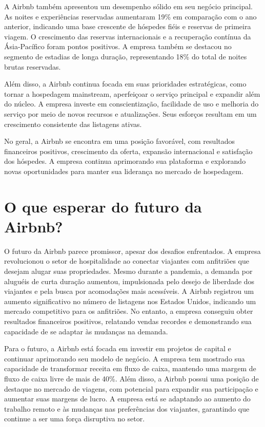 \documentclass{article}
\begin{document}
A Airbnb também apresentou um desempenho sólido em seu negócio principal. As noites e experiências reservadas aumentaram 19\% em comparação com o ano anterior, indicando uma base crescente de hóspedes fiéis e reservas de primeira viagem. O crescimento das reservas internacionais e a recuperação contínua da Ásia-Pacífico foram pontos positivos. A empresa também se destacou no segmento de estadias de longa duração, representando 18\% do total de noites brutas reservadas.

Além disso, a Airbnb continua focada em suas prioridades estratégicas, como tornar a hospedagem mainstream, aperfeiçoar o serviço principal e expandir além do núcleo. A empresa investe em conscientização, facilidade de uso e melhoria do serviço por meio de novos recursos e atualizações. Seus esforços resultam em um crescimento consistente das listagens ativas.

No geral, a Airbnb se encontra em uma posição favorável, com resultados financeiros positivos, crescimento da oferta, expansão internacional e satisfação dos hóspedes. A empresa continua aprimorando sua plataforma e explorando novas oportunidades para manter sua liderança no mercado de hospedagem.
    \section*{O que esperar do futuro da Airbnb?}
O futuro da Airbnb parece promissor, apesar dos desafios enfrentados. A empresa revolucionou o setor de hospitalidade ao conectar viajantes com anfitriões que desejam alugar suas propriedades. Mesmo durante a pandemia, a demanda por aluguéis de curta duração aumentou, impulsionada pelo desejo de liberdade dos viajantes e pela busca por acomodações mais acessíveis. A Airbnb registrou um aumento significativo no número de listagens nos Estados Unidos, indicando um mercado competitivo para os anfitriões. No entanto, a empresa conseguiu obter resultados financeiros positivos, relatando vendas recordes e demonstrando sua capacidade de se adaptar às mudanças na demanda.

Para o futuro, a Airbnb está focada em investir em projetos de capital e continuar aprimorando seu modelo de negócio. A empresa tem mostrado sua capacidade de transformar receita em fluxo de caixa, mantendo uma margem de fluxo de caixa livre de mais de 40\%. Além disso, a Airbnb possui uma posição de destaque no mercado de viagens, com potencial para expandir sua participação e aumentar suas margens de lucro. A empresa está se adaptando ao aumento do trabalho remoto e às mudanças nas preferências dos viajantes, garantindo que continue a ser uma força disruptiva no setor.
\end{document}
